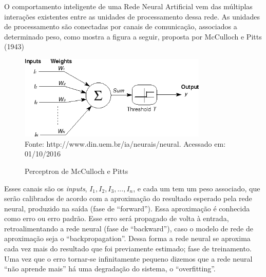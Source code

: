O comportamento inteligente de uma Rede Neural Artificial vem das múltiplas interações existentes entre as unidades de processamento dessa rede. 
As unidades de processamento são conectadas por canais de comunicação, associados a determinado peso, como mostra a figura a seguir, proposta por McCulloch e Pitts (1943)

\begin{figure}[!ht]
\centering
\caption{Perceptron de McCulloch e Pitts}
\vspace{1mm}
\includegraphics[width=90mm, height=40mm]{Figuras/Neural/Perceptron.png}\\
\tiny Fonte: http://www.din.uem.br/ia/neurais/neural. Acessado em: 01/10/2016
\end{figure}

Esses canais são os  \textit{inputs}, $ I_{1}, I_{2}, I_{3},...,I_{n}$, e cada um tem um peso associado, que serão calibrados de acordo 
com a aproximação do resultado esperado pela rede neural, produzido na saída (fase de ``forward''). 
Essa aproximação é conhecida como erro ou erro padrão. Esse erro será propagado de volta à entrada, retroalimentando a rede neural (fase de ``backward''), 
caso o modelo de rede de aproximação seja o ``backpropagation''. Dessa forma a rede neural se aproxima cada vez mais do resultado que foi previamente estimado; fase de treinamento.
Uma vez que o erro tornar-se infinitamente pequeno dizemos que a rede neural ``não aprende mais'' há uma degradação do sistema, o ``overfitting''.


